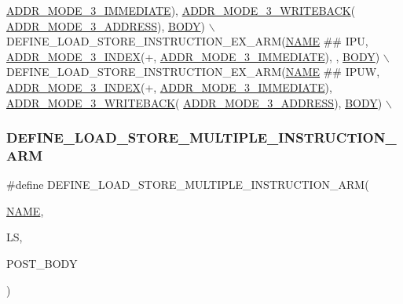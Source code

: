 \begin{DoxyCode}
      \mbox{\hyperlink{isa-arm_8c_afa669bfbc7c5208d436af2e761d2ebd3}{ADDR\_MODE\_3\_IMMEDIATE}}), \mbox{\hyperlink{isa-arm_8c_a0d44b0f2a0d138f9a20b8c02b2b48729}{ADDR\_MODE\_3\_WRITEBACK}}(
      \mbox{\hyperlink{isa-arm_8c_ae2a849434504cbd28290fd7743dead97}{ADDR\_MODE\_3\_ADDRESS}}), \mbox{\hyperlink{gzlog_8c_aa6bdf6a6d9916c343e1e17774d84a156}{BODY}}) \(\backslash\)
    DEFINE\_LOAD\_STORE\_INSTRUCTION\_EX\_ARM(\mbox{\hyperlink{inflate_8h_a164ea0159d5f0b5f12a646f25f99eceaa67bc2ced260a8e43805d2480a785d312}{NAME}} ## IPU, \mbox{\hyperlink{isa-arm_8c_a7ce011f92bca494c8cd99803901c5b50}{ADDR\_MODE\_3\_INDEX}}(+, 
      \mbox{\hyperlink{isa-arm_8c_afa669bfbc7c5208d436af2e761d2ebd3}{ADDR\_MODE\_3\_IMMEDIATE}}), , \mbox{\hyperlink{gzlog_8c_aa6bdf6a6d9916c343e1e17774d84a156}{BODY}}) \(\backslash\)
    DEFINE\_LOAD\_STORE\_INSTRUCTION\_EX\_ARM(\mbox{\hyperlink{inflate_8h_a164ea0159d5f0b5f12a646f25f99eceaa67bc2ced260a8e43805d2480a785d312}{NAME}} ## IPUW, \mbox{\hyperlink{isa-arm_8c_a7ce011f92bca494c8cd99803901c5b50}{ADDR\_MODE\_3\_INDEX}}(+, 
      \mbox{\hyperlink{isa-arm_8c_afa669bfbc7c5208d436af2e761d2ebd3}{ADDR\_MODE\_3\_IMMEDIATE}}), \mbox{\hyperlink{isa-arm_8c_a0d44b0f2a0d138f9a20b8c02b2b48729}{ADDR\_MODE\_3\_WRITEBACK}}(
      \mbox{\hyperlink{isa-arm_8c_ae2a849434504cbd28290fd7743dead97}{ADDR\_MODE\_3\_ADDRESS}}), \mbox{\hyperlink{gzlog_8c_aa6bdf6a6d9916c343e1e17774d84a156}{BODY}}) \(\backslash\)
\end{DoxyCode}
\mbox{\label{isa-arm_8c_a7b4adc68a678b215df70ac335245adca}} 
\subsubsection{\texorpdfstring{D\+E\+F\+I\+N\+E\+\_\+\+L\+O\+A\+D\+\_\+\+S\+T\+O\+R\+E\+\_\+\+M\+U\+L\+T\+I\+P\+L\+E\+\_\+\+I\+N\+S\+T\+R\+U\+C\+T\+I\+O\+N\+\_\+\+A\+RM}{DEFINE\_LOAD\_STORE\_MULTIPLE\_INSTRUCTION\_ARM}}
{\footnotesize\ttfamily \#define D\+E\+F\+I\+N\+E\+\_\+\+L\+O\+A\+D\+\_\+\+S\+T\+O\+R\+E\+\_\+\+M\+U\+L\+T\+I\+P\+L\+E\+\_\+\+I\+N\+S\+T\+R\+U\+C\+T\+I\+O\+N\+\_\+\+A\+RM(\begin{DoxyParamCaption}\item[{}]{\mbox{\hyperlink{inflate_8h_a164ea0159d5f0b5f12a646f25f99eceaa67bc2ced260a8e43805d2480a785d312}{N\+A\+ME}},  }\item[{}]{LS,  }\item[{}]{P\+O\+S\+T\+\_\+\+B\+O\+DY }\end{DoxyParamCaption})}

